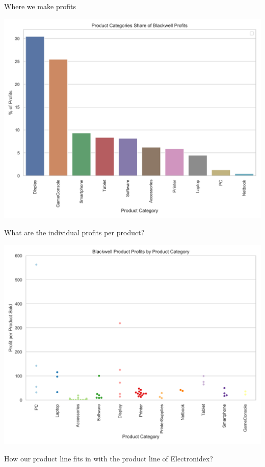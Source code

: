 \documentclass[12pt,a4paper,leqno]{report}
\theoremstyle{plain}
\theoremstyle{definition}
\theoremstyle{remark}
\begin{document}
Where we make profits

\bigskip
{
    \centering
    \includegraphics[width=\textwidth,height=\textheight,keepaspectratio]{blackwell_profits_share_by_product_category.png}
    \par
}
\bigskip

What are the individual profits per product?

\bigskip
{
    \centering
    \includegraphics[width=\textwidth,height=\textheight,keepaspectratio]{blackwell_product_profitability_distribution_by_category.png}
    \par
}
\bigskip

How our product line fits in with the product line of Electronidex?
\end{document}
